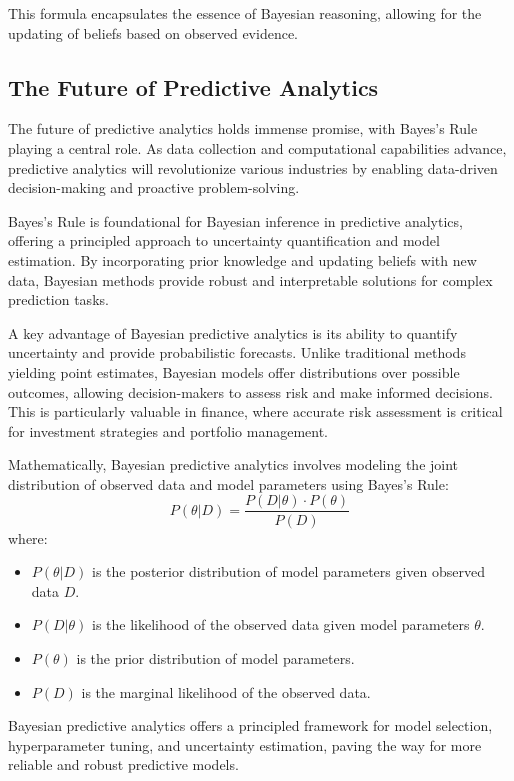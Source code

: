 \documentclass[12pt]{book} %
\begin{document}
This formula encapsulates the essence of Bayesian reasoning, allowing for the updating of beliefs based on observed evidence.

\subsection{The Future of Predictive Analytics}
The future of predictive analytics holds immense promise, with Bayes's Rule playing a central role. As data collection and computational capabilities advance, predictive analytics will revolutionize various industries by enabling data-driven decision-making and proactive problem-solving.

Bayes's Rule is foundational for Bayesian inference in predictive analytics, offering a principled approach to uncertainty quantification and model estimation. By incorporating prior knowledge and updating beliefs with new data, Bayesian methods provide robust and interpretable solutions for complex prediction tasks.

A key advantage of Bayesian predictive analytics is its ability to quantify uncertainty and provide probabilistic forecasts. Unlike traditional methods yielding point estimates, Bayesian models offer distributions over possible outcomes, allowing decision-makers to assess risk and make informed decisions. This is particularly valuable in finance, where accurate risk assessment is critical for investment strategies and portfolio management.

Mathematically, Bayesian predictive analytics involves modeling the joint distribution of observed data and model parameters using Bayes's Rule:
\begin{equation*}
    P(\theta|D) = \frac{P(D|\theta) \cdot P(\theta)}{P(D)}
\end{equation*}
where:
\begin{itemize}
    \item \(P(\theta|D)\) is the posterior distribution of model parameters given observed data \(D\).
    \item \(P(D|\theta)\) is the likelihood of the observed data given model parameters \(\theta\).
    \item \(P(\theta)\) is the prior distribution of model parameters.
    \item \(P(D)\) is the marginal likelihood of the observed data.
\end{itemize}

Bayesian predictive analytics offers a principled framework for model selection, hyperparameter tuning, and uncertainty estimation, paving the way for more reliable and robust predictive models.
\end{document}
